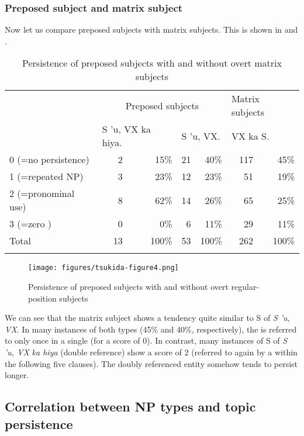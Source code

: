 \documentclass[output=paper
,modfonts
,nonflat]{langsci/langscibook}
\begin{document}
\subsubsection{\label{s:tsukida:5.3.2}Preposed subject and matrix subject}

Now let us compare preposed subjects with matrix subjects. This is shown in  and .

\begin{table}
\begin{tabularx}{\textwidth}{Xrrrrrr} 
	\lsptoprule
	& \multicolumn{4}{c}{Preposed subjects} & \multicolumn{2}{l}{Matrix subjects}\\ \cmidrule{2-5}
	& \multicolumn{2}{l}{S 'u, VX ka hiya.} & \multicolumn{2}{l}{ S 'u, VX.} & \multicolumn{2}{l}{ VX ka S.}\\
	\midrule
	0 (=no persistence) &  2 &  15\% &  21 &  40\% &  117 &  45\%\\
	1 (=repeated NP) &  3 &  23\% &  12 &  23\% &  51 &  19\%\\
	2 (=pronominal use) &  8 &  62\% &  14 &  26\% &  65 &  25\%\\
	3 (=zero \isi{pronoun}) &  0 &  0\% &  6 &  11\% &  29 &  11\%\\
	\midrule
	Total &  13 &  100\% &  53 &  100\% &  262 &  100\%\\
	\lspbottomrule
\end{tabularx}
	\caption{Persistence of preposed subjects with and without overt matrix subjects}
	\label{tab:tsukida:12}
\end{table}

\begin{figure}
	\texttt{[image: figures/tsukida-figure4.png]}
	\caption{Persistence of preposed subjects with and without overt regular-position subjects}
	\label{fig:tsukida:4}
\end{figure}

We can see that the matrix subject shows a tendency quite similar to S of \textit{S '}\textit{u, VX}. In many instances of both types (45\% and 40\%, respectively), the  is referred to only once in a single  (for a score of 0). In contrast, many instances of S of \textit{S '}\textit{u, VX} \textit{ka hiya} (double reference) show a score of 2 (referred to again by a  within the following five clauses). The doubly referenced entity somehow tends to persist longer.

\subsection{\label{s:tsukida:5.4}Correlation between NP types and topic persistence}
\end{document}

